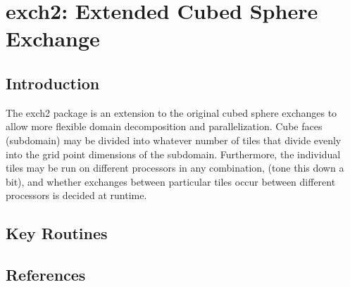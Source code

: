 


\section{exch2: Extended Cubed Sphere Exchange}
\label{sec:exch2}


\subsection{Introduction}

The exch2 package is an extension to the original cubed sphere exchanges
to allow more flexible domain decomposition and parallelization.  Cube faces
(subdomain) may be divided into whatever number of tiles that divide evenly
into the grid point dimensions of the subdomain.  Furthermore, the individual
tiles may be run on different processors in any combination, (tone this down 
a bit), and whether exchanges between particular tiles occur between different
processors is decided at runtime.







\subsection{Key Routines}



\subsection{References}
